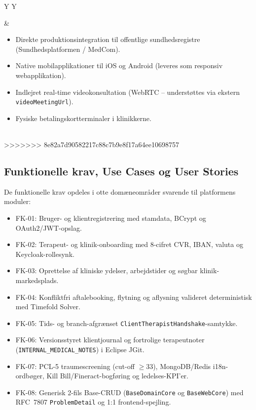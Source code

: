 \documentclass[11pt,a4paper]{article}
\begin{document}
\begin{table}[htbp]
\begin{table}[htbp]
\begin{tabularx}{\textwidth}{Y Y}
\begin{itemize}[leftmargin=*, nosep, topsep=2pt]
\end{itemize} &
\begin{itemize}[leftmargin=*, nosep, topsep=2pt]
    \item Direkte produktionsintegration til offentlige sundhedsregistre (Sundhedsplatformen / MedCom).
    \item Native mobilapplikationer til iOS og Android (leveres som responsiv webapplikation).
    \item Indlejret real-time videokonsultation (WebRTC -- understøttes via ekstern \texttt{videoMeetingUrl}).
    \item Fysiske betalingskortterminaler i klinikkerne.
\end{itemize} \\
>>>>>>> 8e82a7d90582217c88c7b9e8f17a64ee10698757
\bottomrule
\end{tabularx}
\caption{Afgrænsning af hovedopgavens rammer: In Scope vs. Out of Scope.}
\label{tab:scope}
\end{table}

\subsection{Funktionelle krav, Use Cases og User Stories}
De funktionelle krav opdeles i otte domæneområder svarende til platformens moduler:
\begin{itemize}[noitemsep]
    \item FK-01: Bruger- og klientregistrering med stamdata, BCrypt og OAuth2/JWT-opslag.
    \item FK-02: Terapeut- og klinik-onboarding med 8-cifret CVR, IBAN, valuta og Keycloak-rollesynk.
    \item FK-03: Oprettelse af kliniske ydelser, arbejdstider og søgbar klinik-markedsplads.
    \item FK-04: Konfliktfri aftalebooking, flytning og aflysning valideret deterministisk med Timefold Solver.
    \item FK-05: Tids- og branch-afgrænset \texttt{ClientTherapistHandshake}-samtykke.
    \item FK-06: Versionsstyret klientjournal og fortrolige terapeutnoter (\texttt{INTERNAL\_MEDICAL\_NOTES}) i Eclipse JGit.
    \item FK-07: PCL-5 traumescreening (cut-off $\ge 33$), MongoDB/Redis i18n-ordbøger, Kill Bill/Fineract-bogføring og ledelses-KPI'er.
    \item FK-08: Generisk 2-fils Base-CRUD (\texttt{BaseDomainCore} og \texttt{BaseWebCore}) med RFC~7807 \texttt{ProblemDetail} og 1:1 frontend-spejling.
\end{itemize}


\end{table}
\end{document}
